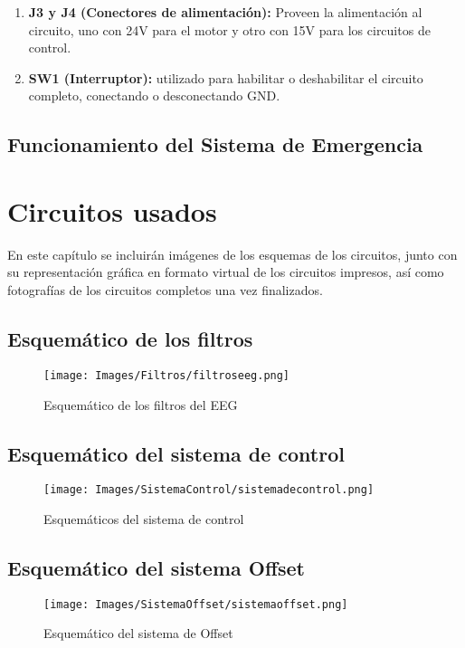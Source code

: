 \documentclass{article}
\begin{document}
\begin{enumerate}
    \item \textbf{J3 y J4 (Conectores de alimentación):} Proveen la alimentación al circuito, uno con 24V para el motor y otro con 15V para los circuitos de control.
    
    \item \textbf{SW1 (Interruptor):}  utilizado para habilitar o deshabilitar el circuito completo, conectando o desconectando GND.
    
\end{enumerate}


\subsection{Funcionamiento del Sistema de Emergencia}



\section{Circuitos usados}
En este capítulo se incluirán imágenes de los esquemas de los circuitos, junto con su representación gráfica en formato virtual de los circuitos impresos, así como fotografías de los circuitos completos una vez finalizados.


\subsection{Esquemático de los filtros}
\begin{figure}[H]
    \centering
    \texttt{[image: Images/Filtros/filtroseeg.png]}
    \caption{Esquemático de los filtros del EEG}
\end{figure}

\subsection{Esquemático del sistema de control}
\begin{figure}[H]
    \centering
    \texttt{[image: Images/SistemaControl/sistemadecontrol.png]}
    \caption{Esquemáticos del sistema de control}
\end{figure}

\subsection{Esquemático del sistema Offset}
\begin{figure}[H]
    \centering
    \texttt{[image: Images/SistemaOffset/sistemaoffset.png]}
    \caption{Esquemático del sistema de Offset}
\end{figure}
\end{document}
